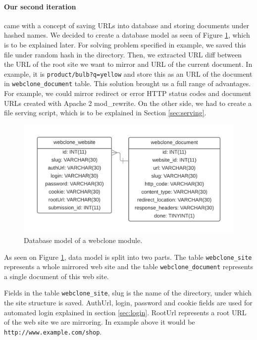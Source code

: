 \paragraph{Our second iteration} came with a concept of saving URLs into database and storing documents under hashed names. We decided to create a database model as seen of Figure \ref{webclonemodel}, which is to be explained later. For solving problem specified in example, we saved this file under random hash in the directory. Then, we extracted URL diff between the URL of the root site we want to mirror and URL of the current document. In example, it is \texttt{product/bulb?q=yellow} and store this as an URL of the document in \texttt{webclone\_document} table. This solution brought us a full range of advantages. For example, we could mirror redirect or error HTTP status codes and document URLs created with Apache 2 mod\_rewrite. On the other side, we had to create a file serving script, which is to be explained in Section \ref{sec:serving}.

\begin{figure}[h]
    \centering
    \includegraphics[width=\textwidth]{images/databaseWebclone.png}
    \caption{Database model of a webclone module.}
    \label{webclonemodel}
\end{figure}

As seen on Figure \ref{webclonemodel}, data model is split into two parts. The table \texttt{webclone\_site} represents a whole mirrored web site and the table \texttt{webclone\_document} represents a single document of this web site.

Fields in the table \texttt{webclone\_site}, slug is the name of the directory, under which the site structure is saved. AuthUrl, login, password and cookie fields are used for automated login explained in section \ref{sec:login}. RootUrl represents a root URL of the web site we are mirroring. In example above it would be \texttt{http://www.example.com/shop}.

